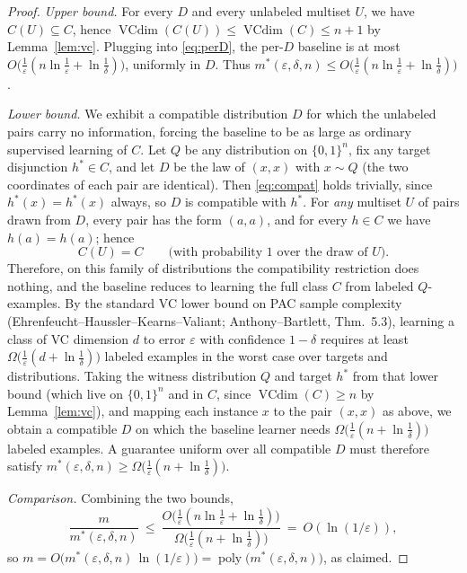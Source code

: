 \documentclass{amsart}
\theoremstyle{definition}
\theoremstyle{remark}
\newcommand{\eps}{\varepsilon}
\DeclareMathOperator{\VCdim}{VCdim}
\DeclareMathOperator{\poly}{poly}
\begin{document}
\begin{proof}
\emph{Upper bound.} For every $D$ and every unlabeled multiset $U$, we have
$C(U)\subseteq C$, hence $\VCdim(C(U))\le\VCdim(C)\le n+1$ by
Lemma~\ref{lem:vc}. Plugging into \eqref{eq:perD}, the per-$D$ baseline is at
most $O\big(\tfrac1\eps(n\ln\tfrac1\eps+\ln\tfrac1\delta)\big)$, uniformly in
$D$. Thus $m^*(\eps,\delta,n)\le O\big(\tfrac1\eps(n\ln\tfrac1\eps+\ln\tfrac1\delta)\big)$.

\emph{Lower bound.} We exhibit a compatible distribution $D$ for which the
unlabeled pairs carry no information, forcing the baseline to be as large as
ordinary supervised learning of $C$. Let $Q$ be any distribution on
$\{0,1\}^n$, fix any target disjunction $h^*\in C$, and let $D$ be the law of
$(x,x)$ with $x\sim Q$ (the two coordinates of each pair are identical). Then
\eqref{eq:compat} holds trivially, since $h^*(x)=h^*(x)$ always, so $D$ is
compatible with $h^*$. For \emph{any} multiset $U$ of pairs drawn from $D$,
every pair has the form $(a,a)$, and for every $h\in C$ we have $h(a)=h(a)$;
hence
\[
C(U)=C\qquad\text{(with probability $1$ over the draw of } U).
\]
Therefore, on this family of distributions the compatibility restriction does
nothing, and the baseline reduces to learning the full class $C$ from labeled
$Q$-examples. By the standard VC lower bound on PAC sample complexity
(Ehrenfeucht--Haussler--Kearns--Valiant; Anthony--Bartlett, Thm.~5.3), learning a
class of VC dimension $d$ to error $\eps$ with confidence $1-\delta$ requires at
least $\Omega\big(\tfrac1\eps(d+\ln\tfrac1\delta)\big)$ labeled examples in the
worst case over targets and distributions. Taking the witness distribution $Q$
and target $h^*$ from that lower bound (which live on $\{0,1\}^n$ and in $C$,
since $\VCdim(C)\ge n$ by Lemma~\ref{lem:vc}), and mapping each instance $x$ to
the pair $(x,x)$ as above, we obtain a compatible $D$ on which the baseline
learner needs $\Omega\big(\tfrac1\eps(n+\ln\tfrac1\delta)\big)$ labeled examples.
A guarantee uniform over all compatible $D$ must therefore satisfy
$m^*(\eps,\delta,n)\ge\Omega\big(\tfrac1\eps(n+\ln\tfrac1\delta)\big)$.

\emph{Comparison.} Combining the two bounds,
\[
\frac{m}{m^*(\eps,\delta,n)}
\ \le\ \frac{O\big(\tfrac1\eps(n\ln\tfrac1\eps+\ln\tfrac1\delta)\big)}
       {\Omega\big(\tfrac1\eps(n+\ln\tfrac1\delta)\big)}
\ =\ O(\ln(1/\eps)),
\]
so $m=O\big(m^*(\eps,\delta,n)\,\ln(1/\eps)\big)=\poly\big(m^*(\eps,\delta,n)\big)$,
as claimed.
\end{proof}
\end{document}
